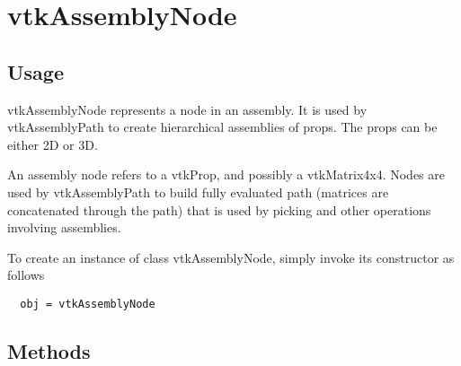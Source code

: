 \section{vtkAssemblyNode}

\subsection{Usage}

 vtkAssemblyNode represents a node in an assembly. It is used by
 vtkAssemblyPath to create hierarchical assemblies of props. The
 props can be either 2D or 3D.

 An assembly node refers to a vtkProp, and possibly a vtkMatrix4x4.
 Nodes are used by vtkAssemblyPath to build fully evaluated path
 (matrices are concatenated through the path) that is used by picking
 and other operations involving assemblies.

To create an instance of class vtkAssemblyNode, simply
invoke its constructor as follows
\begin{verbatim}
  obj = vtkAssemblyNode
\end{verbatim}
\subsection{Methods}

